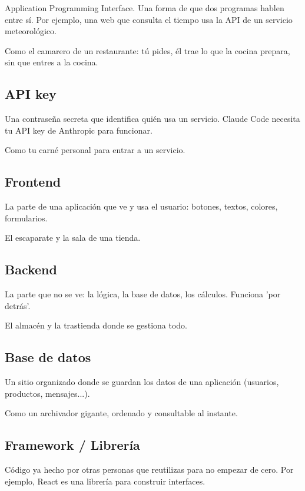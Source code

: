 \documentclass[11pt,a4paper]{report}
\begin{document}
Application Programming Interface. Una forma de que dos programas hablen entre sí. Por ejemplo, una web que consulta el tiempo usa la API de un servicio meteorológico.

Como el camarero de un restaurante: tú pides, él trae lo que la cocina prepara, sin que entres a la cocina.

\subsection{API key}

Una contraseña secreta que identifica quién usa un servicio. Claude Code necesita tu API key de Anthropic para funcionar.

Como tu carné personal para entrar a un servicio.

\subsection{Frontend}

La parte de una aplicación que ve y usa el usuario: botones, textos, colores, formularios.

El escaparate y la sala de una tienda.

\subsection{Backend}

La parte que no se ve: la lógica, la base de datos, los cálculos. Funciona 'por detrás'.

El almacén y la trastienda donde se gestiona todo.

\subsection{Base de datos}

Un sitio organizado donde se guardan los datos de una aplicación (usuarios, productos, mensajes...).

Como un archivador gigante, ordenado y consultable al instante.

\subsection{Framework / Librería}

Código ya hecho por otras personas que reutilizas para no empezar de cero. Por ejemplo, React es una librería para construir interfaces.
\end{document}
